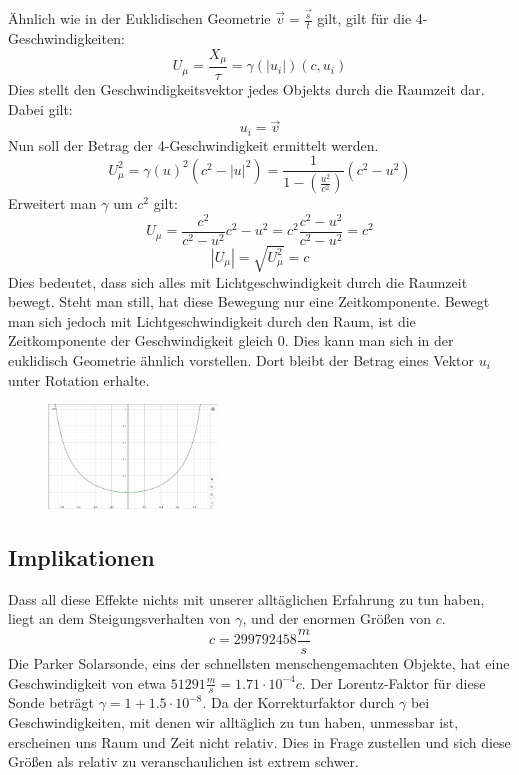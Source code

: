 \documentclass[12pt]{article}
\begin{document}
Ähnlich wie in der Euklidischen Geometrie $\vec{v} = \frac{\vec{s}}{t}$ gilt, gilt für die 4-Geschwindigkeiten:
\begin{equation}
	U_\mu = \frac{X_\mu}{\tau} = \gamma(|u_i|) (c,u_i)
\end{equation}
Dies stellt den Geschwindigkeitsvektor jedes Objekts durch die Raumzeit dar.
Dabei gilt:
\begin{equation}
u_i = \vec{v}
\end{equation}
Nun soll der Betrag der 4-Geschwindigkeit ermittelt werden.
\begin{equation}
U_\mu ^2 = \gamma(u)^2(c^2-|u|^2) = \frac{1}{1-(\frac{u^2}{c^2})} (c^2 - u^2)
\end{equation}
Erweitert man $\gamma$ um $c^2$ gilt:
\begin{equation}
	U_\mu = \frac{c^2}{c^2 - u^2} c^2 - u^2 = c^2 \frac{c^2 - u^2}{c^2 - u^2} = c^2
\end{equation}
\begin{equation}
	|U_\mu| = \sqrt{U_\mu^2} = c
\end{equation}
Dies bedeutet, dass sich alles mit Lichtgeschwindigkeit durch die Raumzeit bewegt.
Steht man still, hat diese Bewegung nur eine Zeitkomponente.
Bewegt man sich jedoch mit Lichtgeschwindigkeit durch den Raum, ist die Zeitkomponente der Geschwindigkeit gleich 0.
Dies kann man sich in der euklidisch Geometrie ähnlich vorstellen.
Dort bleibt der Betrag eines Vektor $u_i$ unter Rotation erhalte.
\begin{figure}
\centering
\includegraphics[width=0.4\textwidth]{gamma.png}
\end{figure}
\subsection{Implikationen}
Dass all diese Effekte nichts mit unserer alltäglichen Erfahrung zu tun haben, liegt an dem Steigungsverhalten von $\gamma$, und der enormen Größen von $c$.
\begin{equation}
c = 299792458 \frac{m}{s}
\end{equation}
Die Parker Solarsonde, eins der schnellsten menschengemachten Objekte, hat eine Geschwindigkeit von etwa $51291 \frac{m}{s} = 1.71 \cdot 10^{-4} c$.
Der Lorentz-Faktor für diese Sonde beträgt $\gamma = 1 + 1.5\cdot10^{-8}$.
Da der Korrekturfaktor durch $\gamma$ bei Geschwindigkeiten, mit denen wir alltäglich zu tun haben, unmessbar ist, erscheinen uns Raum und Zeit nicht relativ.
Dies in Frage zustellen und sich diese Größen als relativ zu veranschaulichen ist extrem schwer.
\end{document}
